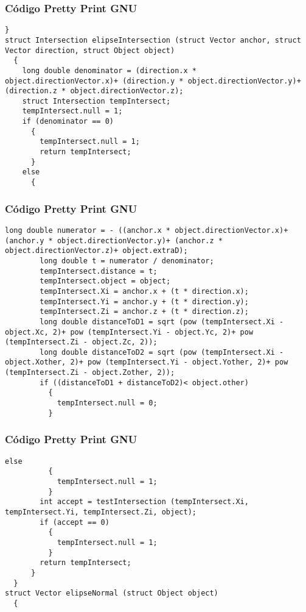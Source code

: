 \documentclass{beamer}
\begin{document}
\begin{frame}[fragile]
\frametitle{C\'odigo Pretty Print GNU}
\begin{lstlisting}[style=CStyle]
  }
struct Intersection elipseIntersection (struct Vector anchor, struct Vector direction, struct Object object)
  {
    long double denominator = (direction.x * object.directionVector.x)+ (direction.y * object.directionVector.y)+ (direction.z * object.directionVector.z);
    struct Intersection tempIntersect;
    tempIntersect.null = 1;
    if (denominator == 0)
      {
        tempIntersect.null = 1;
        return tempIntersect;
      }
    else
      {
        \end{lstlisting}
\end{frame}
\begin{frame}[fragile]
\frametitle{C\'odigo Pretty Print GNU}
\begin{lstlisting}[style=CStyle]
        long double numerator = - ((anchor.x * object.directionVector.x)+ (anchor.y * object.directionVector.y)+ (anchor.z * object.directionVector.z)+ object.extraD);
        long double t = numerator / denominator;
        tempIntersect.distance = t;
        tempIntersect.object = object;
        tempIntersect.Xi = anchor.x + (t * direction.x);
        tempIntersect.Yi = anchor.y + (t * direction.y);
        tempIntersect.Zi = anchor.z + (t * direction.z);
        long double distanceToD1 = sqrt (pow (tempIntersect.Xi - object.Xc, 2)+ pow (tempIntersect.Yi - object.Yc, 2)+ pow (tempIntersect.Zi - object.Zc, 2));
        long double distanceToD2 = sqrt (pow (tempIntersect.Xi - object.Xother, 2)+ pow (tempIntersect.Yi - object.Yother, 2)+ pow (tempIntersect.Zi - object.Zother, 2));
        if ((distanceToD1 + distanceToD2)< object.other)
          {
            tempIntersect.null = 0;
          }
\end{lstlisting}
\end{frame}
\begin{frame}[fragile]
\frametitle{C\'odigo Pretty Print GNU}
\begin{lstlisting}[style=CStyle]
        else
          {
            tempIntersect.null = 1;
          }
        int accept = testIntersection (tempIntersect.Xi, tempIntersect.Yi, tempIntersect.Zi, object);
        if (accept == 0)
          {
            tempIntersect.null = 1;
          }
        return tempIntersect;
      }
  }
struct Vector elipseNormal (struct Object object)
  {
    \end{lstlisting}
\end{frame}
\end{document}
